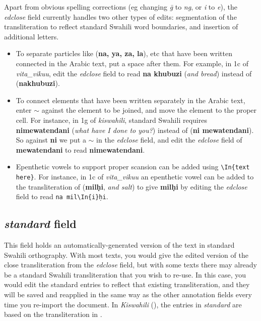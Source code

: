 Apart from obvious spelling corrections (eg changing \textit{ḡ} to \textit{ng}, or \textit{i} to \textit{e}), the \textit{edclose} field currently handles two other types of edits: segmentation of the transliteration to reflect standard Swahili word boundaries, and insertion of additional letters.
\begin{itemize}
\item To separate particles like  (\textbf{na, ya, za, la}), etc that have been written connected in the Arabic text, put a space after them.  For example, in 1c of \textit{vita_vikuu}, edit the \textit{edclose} field to read \textbf{na khubuzi} (\textit{and bread}) instead of  (\textbf{nakhubuzi}).
\item To connect elements that have been written separately in the Arabic text, enter $\sim$ against the element to be joined, and move the element to the proper cell.  For instance, in 1g of \textit{kiswahili}, standard Swahili requires \textbf{nimewatendani} (\textit{what have I done to you?}) instead of  (\textbf{ni mewatendani}).  So against \textbf{ni} we put a $\sim$ in the \textit{edclose} field, and edit the \textit{edclose} field of \textbf{mewatendani} to read \textbf{nimewatendani}.
\item Epenthetic vowels to support proper scansion can be added using \verb|\In{text here}|.  For instance, in 1c of \textit{vita_vikuu} an epenthetic vowel can be added to the transliteration of  (\textbf{milḥi}, \textit{and salt}) to give \textbf{milḥi} by editing the \textit{edclose} field to read \verb|na mil\In{i}ḥi|.
\end{itemize}

\subsection{\textit{standard} field}

This field holds an automatically-generated version of the text in standard Swahili orthography.  With most texts, you would give the edited version of the close transliteration from the \textit{edclose} field, but with some texts there may already be a standard Swahili transliteration that you wish to re-use.  In this case, you would edit the standard entries to reflect that existing transliteration, and they will be saved and reapplied in the same way as the other annotation fields every time you re-import the document.  In \textit{Kiswahili} (), the entries in \textit{standard} are based on the transliteration in \citet{Abdulkadir2013}.

